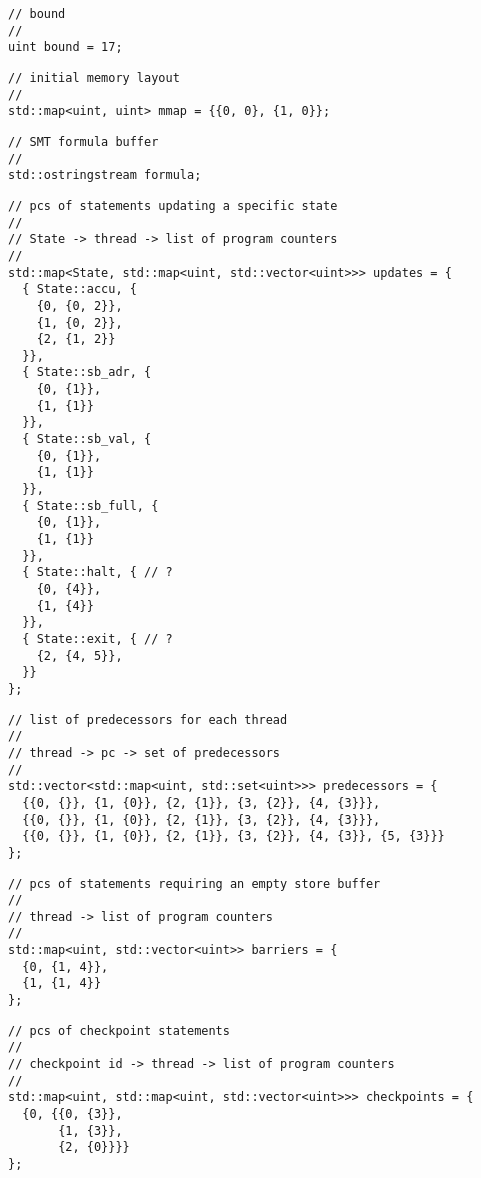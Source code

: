 \begin{lstlisting}[style=c++]
// bound
//
uint bound = 17;
\end{lstlisting}

\begin{lstlisting}[style=c++]
// initial memory layout
//
std::map<uint, uint> mmap = {{0, 0}, {1, 0}};
\end{lstlisting}

\begin{lstlisting}[style=c++]
// SMT formula buffer
//
std::ostringstream formula;
\end{lstlisting}

\begin{lstlisting}[style=c++]
// pcs of statements updating a specific state
//
// State -> thread -> list of program counters
//
std::map<State, std::map<uint, std::vector<uint>>> updates = {
  { State::accu, {
    {0, {0, 2}},
    {1, {0, 2}},
    {2, {1, 2}}
  }},
  { State::sb_adr, {
    {0, {1}},
    {1, {1}}
  }},
  { State::sb_val, {
    {0, {1}},
    {1, {1}}
  }},
  { State::sb_full, {
    {0, {1}},
    {1, {1}}
  }},
  { State::halt, { // ?
    {0, {4}},
    {1, {4}}
  }},
  { State::exit, { // ?
    {2, {4, 5}},
  }}
};
\end{lstlisting}

\begin{lstlisting}[style=c++]
// list of predecessors for each thread
//
// thread -> pc -> set of predecessors
//
std::vector<std::map<uint, std::set<uint>>> predecessors = {
  {{0, {}}, {1, {0}}, {2, {1}}, {3, {2}}, {4, {3}}},
  {{0, {}}, {1, {0}}, {2, {1}}, {3, {2}}, {4, {3}}},
  {{0, {}}, {1, {0}}, {2, {1}}, {3, {2}}, {4, {3}}, {5, {3}}}
};
\end{lstlisting}

\begin{lstlisting}[style=c++]
// pcs of statements requiring an empty store buffer
//
// thread -> list of program counters
//
std::map<uint, std::vector<uint>> barriers = {
  {0, {1, 4}},
  {1, {1, 4}}
};
\end{lstlisting}

\begin{lstlisting}[style=c++]
// pcs of checkpoint statements
//
// checkpoint id -> thread -> list of program counters
//
std::map<uint, std::map<uint, std::vector<uint>>> checkpoints = {
  {0, {{0, {3}},
       {1, {3}},
       {2, {0}}}}
};
\end{lstlisting}


